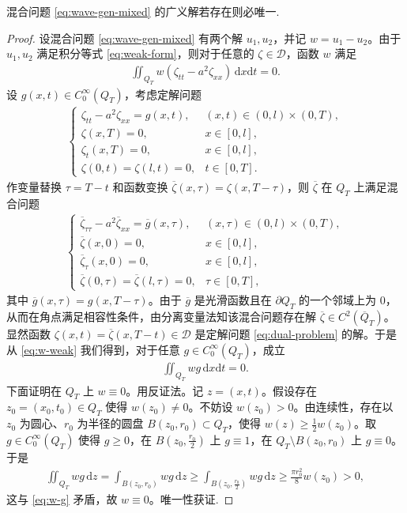 \documentclass[../../main.tex]{subfiles}%
\begin{document}
\begin{theorem}
混合问题 \eqref{eq:wave-gen-mixed} 
的广义解若存在则必唯一.
\end{theorem}
\begin{proof}
设混合问题 \eqref{eq:wave-gen-mixed} 有两个解 $u_1,u_2$，并记 $w=u_1-u_2$。由于 $u_1,u_2$ 满足积分等式 \eqref{eq:weak-form}，则对于任意的 $\zeta\in\mathcal{D}$，函数 $w$ 满足
\begin{align}
\iint_{Q_T}w(\zeta_{tt}-a^2\zeta_{xx})\,\mathrm{d}x\mathrm{d}t=0. \label{eq:w-weak}
\end{align}
设 $g(x,t)\in C_0^\infty(Q_T)$，考虑定解问题
\begin{align}
\begin{cases}
\zeta_{tt}-a^2\zeta_{xx}=g(x,t), & (x,t)\in(0,l)\times(0,T), \\
\zeta(x,T)=0, & x\in[0,l], \\
\zeta_t(x,T)=0, & x\in[0,l], \\
\zeta(0,t)=\zeta(l,t)=0, & t\in[0,T].
\end{cases} \label{eq:dual-problem}
\end{align}
作变量替换 $\tau=T-t$ 和函数变换 $\overline{\zeta}(x,\tau)=\zeta(x,T-\tau)$，则 $\overline{\zeta}$ 在 $Q_T$ 上满足混合问题
\begin{align*}
\begin{cases}
\overline{\zeta}_{\tau\tau}-a^2\overline{\zeta}_{xx}=\overline{g}(x,\tau), & (x,\tau)\in(0,l)\times(0,T), \\
\overline{\zeta}(x,0)=0, & x\in[0,l], \\
\overline{\zeta}_\tau(x,0)=0, & x\in[0,l], \\
\overline{\zeta}(0,\tau)=\overline{\zeta}(l,\tau)=0, & \tau\in[0,T],
\end{cases}
\end{align*}
其中 $\overline{g}(x,\tau)=g(x,T-\tau)$。由于 $\overline{g}$ 是光滑函数且在 $\partial Q_T$ 的一个邻域上为 $0$，从而在角点满足相容性条件，由分离变量法知该混合问题存在解 $\overline{\zeta}\in C^2(\overline{Q}_T)$。显然函数 $\zeta(x,t)=\overline{\zeta}(x,T-t)\in\mathcal{D}$ 是定解问题 \eqref{eq:dual-problem} 的解。于是从 \eqref{eq:w-weak} 我们得到，对于任意 $g\in C_0^\infty(Q_T)$，成立
\begin{align}
\iint_{Q_T}wg\,\mathrm{d}x\mathrm{d}t=0. \label{eq:w-g}
\end{align}
下面证明在 $Q_T$ 上 $w\equiv 0$。用反证法。记 $z=(x,t)$。假设存在 $z_0=(x_0,t_0)\in Q_T$ 使得 $w(z_0)\neq 0$。不妨设 $w(z_0)>0$。由连续性，存在以 $z_0$ 为圆心、$r_0$ 为半径的圆盘 $B(z_0,r_0)\subset Q_T$，使得 $w(z)\geqslant \frac{1}{2}w(z_0)$。取 $g\in C_0^\infty(Q_T)$ 使得 $g\geqslant 0$，在 $B(z_0,\frac{r_0}{2})$ 上 $g\equiv 1$，在 $Q_T\setminus B(z_0,r_0)$ 上 $g\equiv 0$。于是
\begin{align*}
\iint_{Q_T}wg\,\mathrm{d}z
=\int_{B(z_0,r_0)}wg\,\mathrm{d}z
\geqslant \int_{B(z_0,\frac{r_0}{2})}wg\,\mathrm{d}z
\geqslant \frac{\pi r_0^2}{8}w(z_0)>0,
\end{align*}
这与 \eqref{eq:w-g} 矛盾，故 $w\equiv 0$。唯一性获证.
\end{proof}
\end{document}
